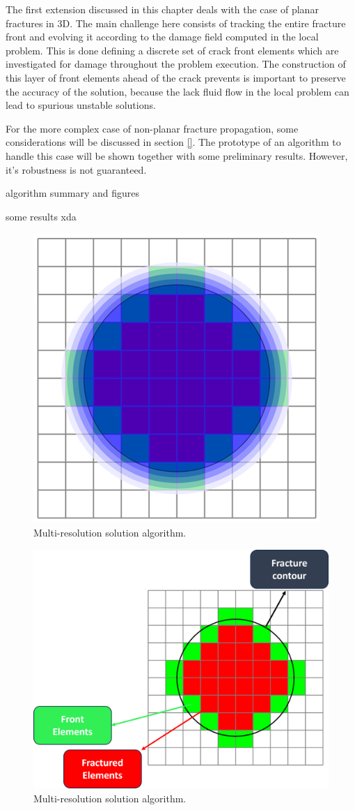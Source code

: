 The first extension discussed in this chapter deals with the case of planar fractures in 3D. The main challenge here consists of tracking the entire fracture front and evolving it according to the damage field computed in the local problem. This is done defining a discrete set of crack front elements which are investigated for damage throughout the problem execution. The construction of this layer of front elements ahead of the crack prevents is important to preserve the accuracy of the solution, because the lack fluid flow in the local problem can lead to spurious unstable solutions.

For the more complex case of non-planar fracture propagation, some considerations will be discussed in section \ref{}. The prototype of an algorithm to handle this case will be shown together with some preliminary results. However, it's robustness is not guaranteed. 

algorithm summary and figures

some results xda

\begin{figure}[h]
    \centering
    \includegraphics[width=0.5\linewidth]{Chapter4/figures/blue_circle.png}
    \caption{Multi-resolution solution algorithm.}
    \label{fig:lorem1}
\end{figure}


\begin{figure}[h]
    \centering
    \includegraphics[width=\linewidth]{Chapter4/figures/penny_with_descriptions.png}
    \caption{Multi-resolution solution algorithm.}
    \label{fig:lorem4}
\end{figure}

